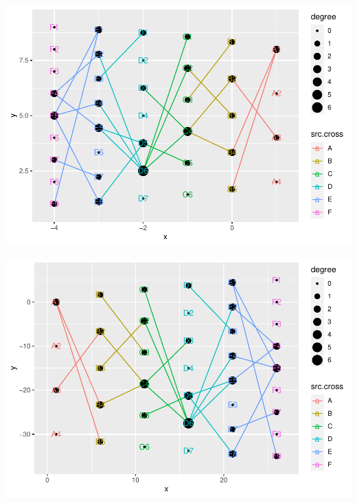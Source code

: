 \documentclass[
]{article}
\newenvironment{Shaded}{\begin{snugshade}}{\end{snugshade}}
\newcommand{\CommentTok}[1]{\textcolor[rgb]{0.56,0.35,0.01}{\textit{#1}}}
\newcommand{\DataTypeTok}[1]{\textcolor[rgb]{0.13,0.29,0.53}{#1}}
\newcommand{\DecValTok}[1]{\textcolor[rgb]{0.00,0.00,0.81}{#1}}
\newcommand{\KeywordTok}[1]{\textcolor[rgb]{0.13,0.29,0.53}{\textbf{#1}}}
\newcommand{\NormalTok}[1]{#1}
\newcommand{\OperatorTok}[1]{\textcolor[rgb]{0.81,0.36,0.00}{\textbf{#1}}}
\newcommand{\StringTok}[1]{\textcolor[rgb]{0.31,0.60,0.02}{#1}}
\begin{document}
\begin{Shaded}
\end{Shaded}

\includegraphics{ReadMe_files/figure-latex/unnamed-chunk-6-4.pdf}

\begin{Shaded}
\end{Shaded}

\includegraphics{ReadMe_files/figure-latex/unnamed-chunk-6-5.pdf}
\end{document}
